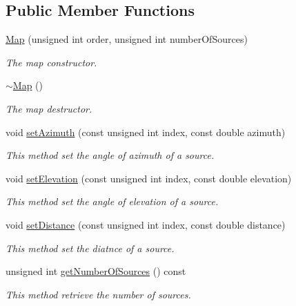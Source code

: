 \subsection*{Public Member Functions}
\begin{DoxyCompactItemize}
\item 
\hyperlink{class_hoa3_d_1_1_map_a442cdcc3ac651b716ae2617fa64c44b4}{Map} (unsigned int order, unsigned int number\-Of\-Sources)
\begin{DoxyCompactList}\small\item\em The map constructor. \end{DoxyCompactList}\item 
\hyperlink{class_hoa3_d_1_1_map_a89f5772a7f26cda206637dd1fca1c16e}{$\sim$\-Map} ()
\begin{DoxyCompactList}\small\item\em The map destructor. \end{DoxyCompactList}\item 
void \hyperlink{class_hoa3_d_1_1_map_a751e3f421578c43bf42eca7888a34839}{set\-Azimuth} (const unsigned int index, const double azimuth)
\begin{DoxyCompactList}\small\item\em This method set the angle of azimuth of a source. \end{DoxyCompactList}\item 
void \hyperlink{class_hoa3_d_1_1_map_ac3f8b037de1d3926206b46884c6c2004}{set\-Elevation} (const unsigned int index, const double elevation)
\begin{DoxyCompactList}\small\item\em This method set the angle of elevation of a source. \end{DoxyCompactList}\item 
void \hyperlink{class_hoa3_d_1_1_map_a23a9cb2b7256d46e6cdc8c40d4bab177}{set\-Distance} (const unsigned int index, const double distance)
\begin{DoxyCompactList}\small\item\em This method set the diatnce of a source. \end{DoxyCompactList}\item 
unsigned int \hyperlink{class_hoa3_d_1_1_map_a49c97eaf507f6ccc9c1e7eb8fbff0ac9}{get\-Number\-Of\-Sources} () const 
\begin{DoxyCompactList}\small\item\em This method retrieve the number of sources. \end{DoxyCompactList}\item 

\end{DoxyCompactItemize}
